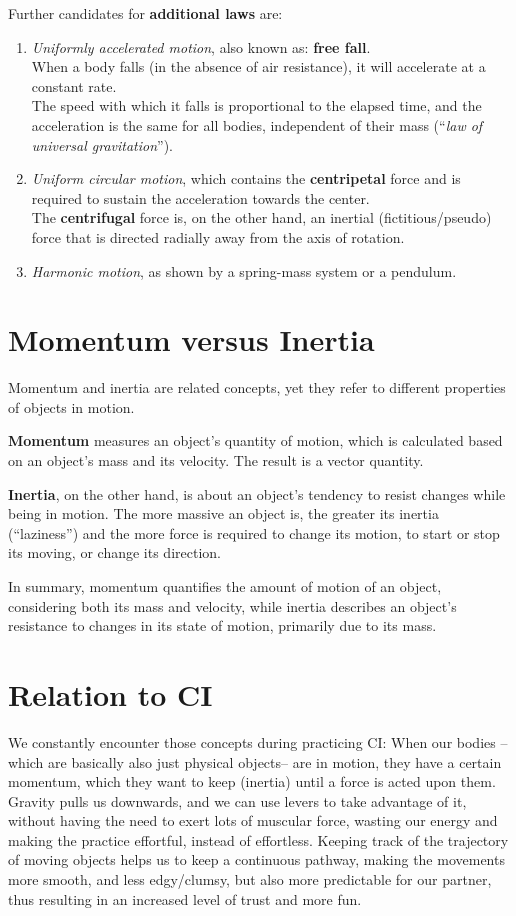 Further candidates for \textbf{additional laws} are:
\begin{enumerate}
    \item \textit{Uniformly accelerated motion}, also known as: \textbf{free fall}. \\
    When a body falls (in the absence of air resistance), it will accelerate at a constant rate. \\
    The speed with which it falls is proportional to the elapsed time, and the acceleration is the same for all bodies, independent of their mass (``\textit{law of universal gravitation}'').
    \item \textit{Uniform circular motion}, which contains the \textbf{centripetal} force and is required to sustain the acceleration towards the center. \\
    The \textbf{centrifugal} force is, on the other hand, an inertial (fictitious/pseudo) force that is directed radially away from the axis of rotation.
    \item \textit{Harmonic motion}, as shown by a spring-mass system or a pendulum.
\end{enumerate}

\section{Momentum versus Inertia}\label{sec:momentum-versus-inertia}

Momentum and inertia are related concepts, yet they refer to different properties of objects in motion.

\textbf{Momentum} measures an object's quantity of motion, which is calculated based on an object's mass and its velocity.
The result is a vector quantity.

\textbf{Inertia}, on the other hand, is about an object's tendency to resist changes while being in motion.
The more massive an object is, the greater its inertia (``laziness'') and the more force is required to change its motion, to start or stop its moving, or change its direction.

In summary, momentum quantifies the amount of motion of an object, considering both its mass and velocity, while inertia describes an object's resistance to changes in its state of motion, primarily due to its mass.

\section{Relation to CI}\label{sec:relation-to-ci}

We constantly encounter those concepts during practicing CI: When our bodies --which are basically also just physical objects-- are in motion, they have a certain momentum, which they want to keep (inertia) until a force is acted upon them.
Gravity pulls us downwards, and we can use levers to take advantage of it, without having the need to exert lots of muscular force, wasting our energy and making the practice effortful, instead of effortless.
Keeping track of the trajectory of moving objects helps us to keep a continuous pathway, making the movements more smooth, and less edgy/clumsy, but also more predictable for our partner, thus resulting in an increased level of trust and more fun.
